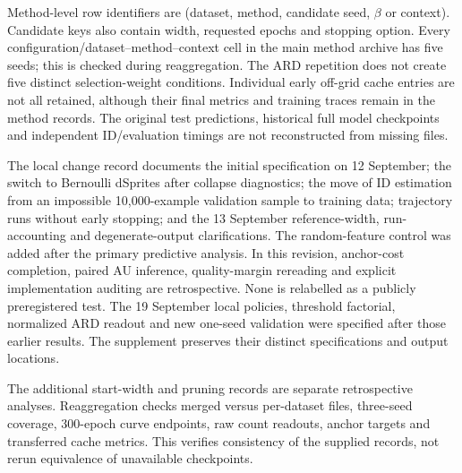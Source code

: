 Method-level row identifiers are
(dataset, method, candidate seed, $\beta$ or context). Candidate keys
also contain width, requested epochs and stopping option. Every
configuration/dataset--method--context cell in the main method archive
has five seeds; this is checked during reaggregation. The ARD repetition
does not create five distinct selection-weight conditions. Individual
early off-grid cache entries are not all retained, although their final
metrics and training traces remain in the method records. The original
test predictions, historical full model checkpoints and independent ID/evaluation
timings are not reconstructed from missing files.

The local change record documents the initial specification on
12 September; the switch to Bernoulli dSprites after collapse diagnostics;
the move of ID estimation from an impossible 10,000-example validation
sample to training data; trajectory runs without early stopping; and
the 13 September reference-width, run-accounting and degenerate-output
clarifications. The random-feature control was added after the primary
predictive analysis. In this revision, anchor-cost completion, paired AU
inference, quality-margin rereading and explicit implementation auditing
are retrospective. None is relabelled as a publicly preregistered test.
The 19 September local policies, threshold factorial, normalized ARD
readout and new one-seed validation were specified after those earlier
results. The supplement preserves their distinct specifications and
output locations.

The additional start-width and pruning records are separate retrospective
analyses. Reaggregation checks merged versus per-dataset files, three-seed
coverage, 300-epoch curve endpoints, raw count readouts, anchor targets
and transferred cache metrics. This verifies consistency of the supplied
records, not rerun equivalence of unavailable checkpoints.
